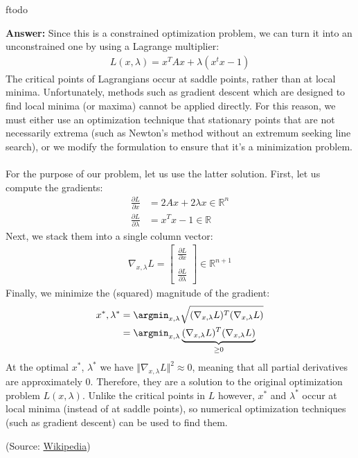 ƒtodo\documentclass{article}
\newenvironment{QandA}{\begin{enumerate}[label=\arabic*.]}{\end{enumerate}}
\newenvironment{answer}{\par\normalfont \textbf{Answer:}}{}
\newcommand{\R}{\mathbb{R}}
\begin{document}
\begin{QandA}
    \begin{answer}
        Since this is a constrained optimization problem, we can turn it into an unconstrained one by using a Lagrange multiplier:
        \begin{align*}
            L(x, \lambda) = x^T A x + \lambda (x^t x - 1) 
        \end{align*}
        The critical points of Lagrangians occur at saddle points, rather than at local minima. Unfortunately, methods such as gradient descent which are designed to find local minima (or maxima) cannot be applied directly. For this reason, we must either use an optimization technique that stationary points that are not necessarily extrema (such as Newton's method without an extremum seeking line search), or we modify the formulation to ensure that it's a minimization problem. \\\\
        For the purpose of our problem, let us use the latter solution. First, let us compute the gradients:
        \begin{align*}
            \frac{\partial L}{ \partial x} &= 2Ax + 2 \lambda x \in \R^n \\ 
            \frac{\partial L}{\partial \lambda} &= x^T x - 1 \in \R
        \end{align*}
        Next, we stack them into a single column vector:
        \begin{align*}
            \nabla_{x, \lambda}L = 
            \begin{bmatrix}
             \frac{\partial L}{\partial x} \\
             \\
             \frac{\partial L}{\partial \lambda}
            \end{bmatrix} \in \R^{n + 1}
        \end{align*}
        Finally, we minimize the (squared) magnitude of the gradient:
        \begin{align*}
            x^{*}, \lambda^{*} &= \argmin_{x, \lambda} \sqrt{(\nabla_{x, \lambda}L)^T (\nabla_{x, \lambda}L)} \\
             &= \argmin_{x, \lambda} \underbrace{(\nabla_{x, \lambda}L)^T (\nabla_{x, \lambda}L)}_{\ge 0}
        \end{align*}
        At the optimal $x^{*}$, $\lambda^{*}$ we have $ \Vert \nabla_{x, \lambda}L \Vert ^2 \approx 0$, meaning that all partial derivatives are approximately $0$. Therefore, they are a solution to the original optimization problem $L(x, \lambda)$. Unlike the critical points in $L$ however, $x^{*}$ and $\lambda^{*}$ occur at local minima (instead of at saddle points), so numerical optimization techniques (such as gradient descent) can be used to find them. 
        
        (Source: \href{https://en.wikipedia.org/wiki/Lagrange_multiplier#Examples}{Wikipedia})
    \end{answer}
\end{QandA}
\end{document}
